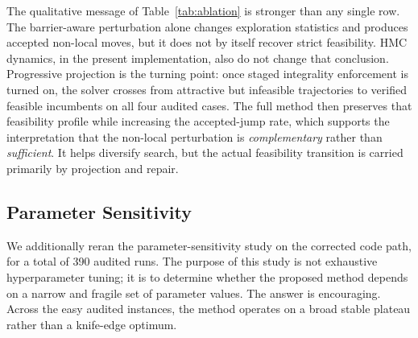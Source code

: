 \begin{table}[htbp]
\centering
\caption{Aggregated ablation results on the four-instance audited benchmark. ``Feasible instances'' counts how many of the four instances end in verified strict feasibility. Mean feasible gap is reported only over successful runs, allowing the contribution of each module to be interpreted separately.}
\label{tab:ablation}
\small
{}
\end{table}

The qualitative message of Table~\ref{tab:ablation} is stronger than any single row. The barrier-aware perturbation alone changes exploration statistics and produces accepted non-local moves, but it does not by itself recover strict feasibility. HMC dynamics, in the present implementation, also do not change that conclusion. Progressive projection is the turning point: once staged integrality enforcement is turned on, the solver crosses from attractive but infeasible trajectories to verified feasible incumbents on all four audited cases. The full method then preserves that feasibility profile while increasing the accepted-jump rate, which supports the interpretation that the non-local perturbation is \emph{complementary} rather than \emph{sufficient}. It helps diversify search, but the actual feasibility transition is carried primarily by projection and repair.

\subsection{Parameter Sensitivity}
\label{subsec:sensitivity}

We additionally reran the parameter-sensitivity study on the corrected code path, for a total of 390 audited runs. The purpose of this study is not exhaustive hyperparameter tuning; it is to determine whether the proposed method depends on a narrow and fragile set of parameter values. The answer is encouraging. Across the easy audited instances, the method operates on a broad stable plateau rather than a knife-edge optimum.

